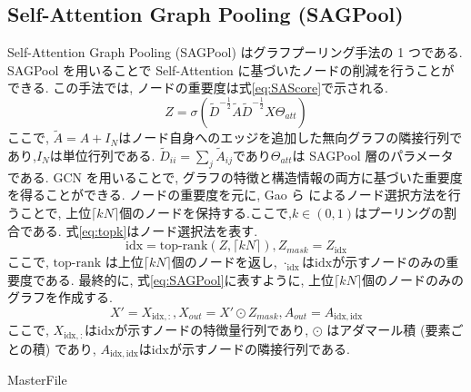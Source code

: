 \documentclass[a4j,twoside,12pt,dvipdfmx]{thesis} %
\begin{document}
\subsection{Self-Attention Graph Pooling (SAGPool)}
Self-Attention Graph Pooling (SAGPool) \cite{lee2019self} はグラフプーリング手法の 1 つである. SAGPool を用いることで Self-Attention に基づいたノードの削減を行うことができる. この手法では, ノードの重要度は式\ref{eq:SAScore}で示される.
\begin{equation}
  \label{eq:SAScore}
  Z = \sigma (\tilde{D}^{-\frac{1}{2}}\tilde{A}\tilde{D}^{-\frac{1}{2}}X\Theta_{att})
\end{equation}
ここで, $\tilde{A} = A + I_{N}$はノード自身へのエッジを追加した無向グラフの隣接行列であり,$I_N$は単位行列である.
$\tilde{D}_{ii} = \sum_{j} \tilde{A}_{ij}$であり$\Theta_{att}$は SAGPool 層のパラメータである.
GCN を用いることで, グラフの特徴と構造情報の両方に基づいた重要度を得ることができる.
ノードの重要度を元に, Gao ら\cite{gao2019proceedings} によるノード選択方法を行うことで, 上位$\lceil kN \rceil$個のノードを保持する.ここで,$k \in (0,1)$はプーリングの割合である. 式\ref{eq:topk}はノード選択法を表す.
\begin{equation}
  \label{eq:topk}
  \mathrm{idx} = \textrm{top-rank}(Z, \lceil kN \rceil ), Z_{mask} = Z_{\mathrm{idx}}
\end{equation}
ここで, $\textrm{top-rank}$ は上位$\lceil kN \rceil$個のノードを返し, $\cdot_{\mathrm{idx}}$は$\mathrm{idx}$が示すノードのみの重要度である.
最終的に, 式\ref{eq:SAGPool}に表すように, 上位$\lceil kN \rceil$個のノードのみのグラフを作成する.
\begin{equation}
  \label{eq:SAGPool}
  X' = X_{\mathrm{idx},:}, X_{out} = X' \odot Z_{mask}, A_{out} = A_{\mathrm{idx,idx}}
\end{equation}
ここで, $X_{\mathrm{idx},:}$は$\mathrm{idx}$が示すノードの特徴量行列であり, $\odot$ はアダマール積 (要素ごとの積) であり, $A_{\mathrm{idx,idx}}$は$\mathrm{idx}$が示すノードの隣接行列である.

\expandafter\ifx\csname MasterFile\endcsname\relax
\def\MasterFile{本原稿です}

%



\end{document}
